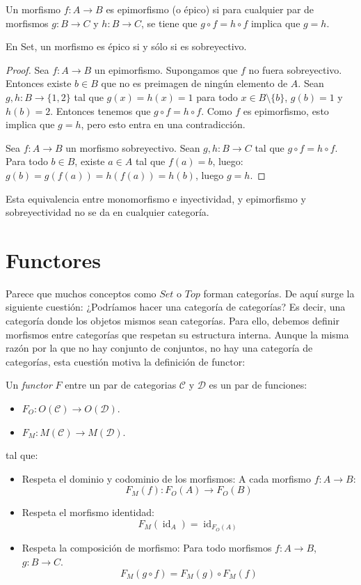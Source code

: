 \documentclass[12pt, twoside]{book}
\newcommand{\cat}{{\mathcal{C}}}
\newcommand{\Set}{{Set}}
\newcommand{\Top}{{Top}}
\DeclareMathOperator{\id}{id}
\begin{document}
\begin{definition}
Un morfismo $f \colon A \to B$ es epimorfismo (o épico) si para cualquier par de morfismos $g \colon B \to C$ y $h \colon B \to C$, se tiene que $g \circ f = h \circ f$ implica que $g = h$.
\end{definition}

\begin{proposition}
En \Set, un morfismo es épico si y sólo si es sobreyectivo.
\end{proposition}

\begin{proof}
Sea $f \colon A \to B$ un epimorfismo. Supongamos que $f$ no fuera sobreyectivo. Entonces existe $b \in B$ que no es preimagen de ningún elemento de $A$. Sean $g, h \colon B \to \{1,2\}$ tal que $g(x)=h(x)=1$ para todo $x \in B \setminus \{b\}$, $g(b) = 1$ y $h(b) = 2$. Entonces tenemos que $g \circ f = h \circ f$. Como $f$ es epimorfismo, esto implica que $g = h$, pero esto entra en una contradicción.

Sea $f \colon A \to B$ un morfismo sobreyectivo. Sean $g, h \colon B \to C$ tal que $g \circ f = h \circ f$. Para todo $b \in B$, existe $a \in A$ tal que $f(a)=b$, luego: $g(b) = g(f(a)) = h(f(a)) = h(b)$, luego $g = h$.
\end{proof}

Esta equivalencia entre monomorfismo e inyectividad, y epimorfismo y sobreyectividad no se da en cualquier categoría.

\section{Functores}
Parece que muchos conceptos como $\Set$ o $\Top$ forman categorías.
De aquí surge la siguiente cuestión: ¿Podríamos hacer una categoría de categorías?
Es decir, una categoría donde los objetos mismos sean categorías.
Para ello, debemos definir morfismos entre categorías que respetan su estructura interna.
Aunque la misma razón por la que no hay conjunto de conjuntos, no hay una categoría de categorías, esta cuestión motiva la definición de functor:

\begin{definition}\label{def:functor}
Un \emph{functor} $F$ entre un par de categorias $\cat$ y $\mathcal{D}$ es un par de funciones:
\begin{itemize}
\item $F_O : O(\cat) \to O(\mathcal{D})$.
\item $F_M : M(\cat) \to M(\mathcal{D})$.
\end{itemize}
tal que:
\begin{itemize}
\item Respeta el dominio y codominio de los morfismos: A cada morfismo $f : A \to B$:
\[ F_M(f) : F_O(A) \to F_O(B) \]
\item Respeta el morfismo identidad:
\[ F_M(\id_A) = \id_{F_O(A)} \]
\item Respeta la composición de morfismo: Para todo morfismos $f : A \to B$, $g : B \to C$.
\[ F_M(g \circ f) = F_M(g) \circ F_M(f) \]
\end{itemize}
\end{definition}
\end{document}
